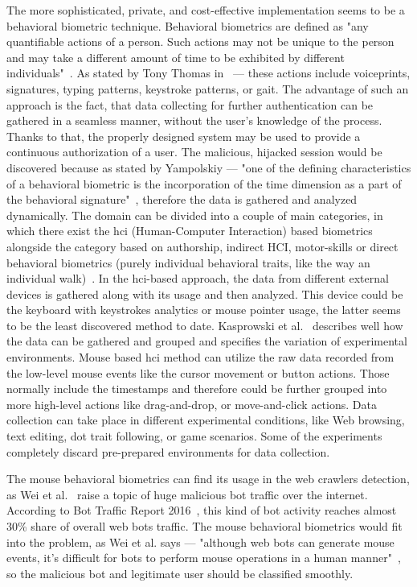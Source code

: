 The more sophisticated, private, and cost-effective implementation seems to be a behavioral biometric technique.
Behavioral biometrics are defined as "any quantifiable actions of a person.
Such actions may not be unique to the person and may take a different amount of time to be exhibited by different individuals"~\cite{Yampolskiy2011}.
As stated by Tony Thomas in~\cite{thomas2020machine} --- these actions include voiceprints, signatures, typing patterns, keystroke patterns, or gait.
The advantage of such an approach is the fact, that data collecting for further authentication can be gathered in a seamless manner, without the user's knowledge of the process.
Thanks to that, the properly designed system may be used to provide a continuous authorization of a user.
The malicious, hijacked session would be discovered because as stated by Yampolskiy --- "one of the defining characteristics of a behavioral biometric is the incorporation of the time dimension as a part of the behavioral signature"~\cite{Yampolskiy2011}, therefore the data is gathered and analyzed dynamically.
The domain can be divided into a couple of main categories, in which there exist the \gls{hci} (Human-Computer Interaction) based biometrics alongside the category based on authorship, indirect HCI, motor-skills or direct behavioral biometrics (purely individual behavioral traits, like the way an individual walk)~\cite{Yampolskiy2011}.
In the \gls{hci}-based approach, the data from different external devices is gathered along with its usage and then analyzed.
This device could be the keyboard with keystrokes analytics or mouse pointer usage, the latter seems to be the least discovered method to date.
Kasprowski et al.~\cite{kasprowski2018fusion} describes well how the data can be gathered and grouped and specifies the variation of experimental environments.
Mouse based \gls{hci} method can utilize the raw data recorded from the low-level mouse events like the cursor movement or button actions.
Those normally include the timestamps and therefore could be further grouped into more high-level actions like drag-and-drop, or move-and-click actions.
Data collection can take place in different experimental conditions, like Web browsing, text editing, dot trait following, or game scenarios.
Some of the experiments completely discard pre-prepared environments for data collection.

The mouse behavioral biometrics can find its usage in the web crawlers detection, as Wei et al.~\cite{a-deep-learning-approach-to-web-bot-detection-using-mouse-behavioral-biometrics} raise a topic of huge malicious bot traffic over the internet.
According to Bot Traffic Report 2016~\cite{bot-share-2016}, this kind of bot activity reaches almost 30\% share of overall web bots traffic.
The mouse behavioral biometrics would fit into the problem, as Wei et al. says --- "although web bots can generate mouse events, it’s difficult for bots to perform mouse operations in a human manner"~\cite{a-deep-learning-approach-to-web-bot-detection-using-mouse-behavioral-biometrics}, so the malicious bot and legitimate user should be classified smoothly.